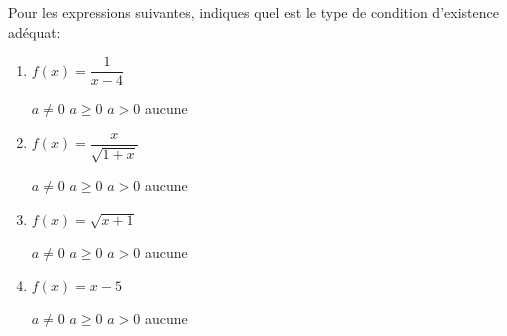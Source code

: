 \documentclass[a4paper,12pt]{report}
\begin{document}
\begin{exercice}
Pour les expressions suivantes, indiques quel est le type de condition d'existence adéquat:

\begin{enumerate}
\item \(f(x)=\dfrac{1}{x-4}\)
\begin{center}
\square \(a\neq 0\) \hspace{1cm}\square \(a\ge 0\) \hspace{1cm}\square \(a>0\)
\hspace{1cm} \square aucune
\end{center}

\item \(f(x)=\dfrac{x}{\sqrt{1+x}}\)
\begin{center}
\square \(a\neq 0\) \hspace{1cm}\square \(a\ge 0\) \hspace{1cm}\square \(a>0\)
\hspace{1cm} \square aucune
\end{center}
\item \(f(x)=\sqrt{x+1}\)
\begin{center}
\square \(a\neq 0\) \hspace{1cm}\square \(a\ge 0\) \hspace{1cm}\square \(a>0\)
\hspace{1cm} \square aucune
\end{center}
\item \(f(x)=x-5\)
\begin{center}
\square \(a\neq 0\) \hspace{1cm}\square \(a\ge 0\) \hspace{1cm}\square \(a>0\)
\hspace{1cm} \square aucune
\end{center}
\end{enumerate}
\end{exercice}
\end{document}
